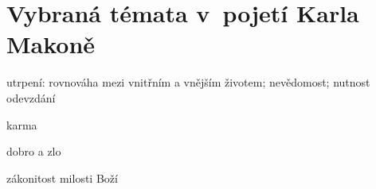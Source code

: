 \chapter{Vybraná témata v~pojetí Karla Makoně}

utrpení:
rovnováha mezi vnitřním a vnějším životem;
nevědomost;
nutnost odevzdání

karma

dobro a zlo

zákonitost milosti Boží
